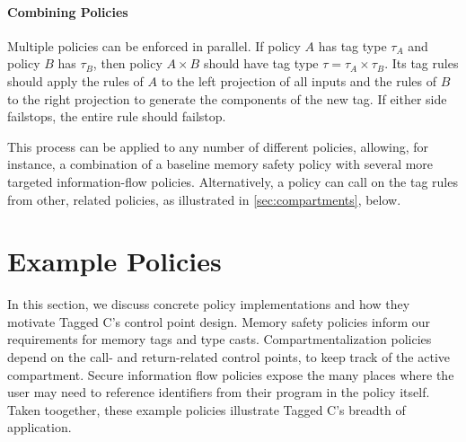 \documentclass{llncs}
\begin{document}



\paragraph{Combining Policies}

Multiple policies can be enforced in parallel. If policy \(A\) has tag type \(\tau_A\)
and policy \(B\) has \(\tau_B\), then policy \(A \times B\) should have tag type
\(\tau = \tau_A \times \tau_B\). Its tag rules should apply the rules of \(A\) to
the left projection of all inputs and the rules of \(B\) to the right projection
to generate the components of the new tag. If either side failstops, the entire
rule should failstop.

This process can be applied to any number of different policies, allowing, for instance,
a combination of a baseline memory safety policy with several more targeted
information-flow policies. Alternatively, a policy can call on the tag rules
from other, related policies, as illustrated in \cref{sec:compartments}, below.

\section{Example Policies}
\label{sec:policies}

In this section, we discuss concrete policy implementations and how 
they motivate Tagged C's control point design. Memory safety policies
inform our requirements for memory tags and type casts. Compartmentalization
policies depend on the call- and return-related control points, to keep track of the
active compartment. Secure information flow policies expose the many places
where the user may need to reference identifiers from their program in the policy itself.
Taken toogether, these example policies illustrate Tagged C's breadth of application.
\end{document}
